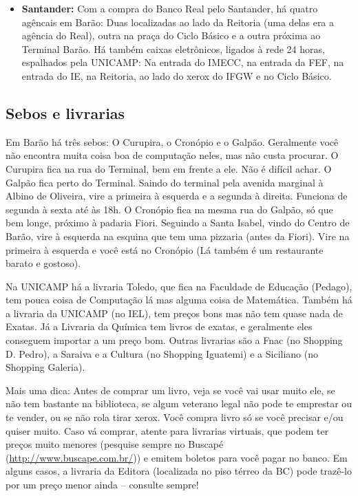 \begin{itemize}
\item  \textbf{Santander:} Com a compra do Banco Real pelo Santander, há quatro agêncais em Barão: Duas localizadas ao lado da Reitoria (uma delas era a agência do Real), outra na praça do Ciclo Básico e a outra próxima ao Terminal Barão. Há também caixas eletrônicos, ligados à rede 24 horas, espalhados pela UNICAMP: Na entrada do IMECC, na entrada da FEF, na entrada do IE, na Reitoria, ao lado do xerox do IFGW e no Ciclo Básico.
\end{itemize}

\subsection{Sebos e livrarias}

Em Barão há três sebos: O Curupira, o Cronópio e o Galpão. Geralmente você não
encontra muita coisa boa de computação neles, mas não custa procurar. O Curupira
fica na rua do Terminal, bem em frente a ele. Não é difícil achar. O Galpão fica
perto do Terminal. Saindo do terminal pela avenida marginal à Albino de
Oliveira, vire a primeira à esquerda e a segunda à direita. Funciona de segunda
à sexta até às 18h. O Cronópio fica na mesma rua do Galpão, só que bem longe,
próximo à padaria Fiori. Seguindo a Santa Isabel, vindo do Centro de Barão, vire
à esquerda na esquina que tem uma pizzaria (antes da Fiori). Vire na primeira
à esquerda e você está no Cronópio (Lá também é um restaurante barato
e gostoso).

Na UNICAMP há a livraria Toledo, que fica na Faculdade de Educação (Pedago), tem
pouca coisa de Computação lá mas alguma coisa de Matemática. Também há
a livraria da UNICAMP (no IEL), tem preços bons mas não tem quase nada de
Exatas. Já a Livraria da Química tem livros de exatas, e geralmente eles
conseguem importar a um preço bom. Outras livrarias são a Fnac (no Shopping D.
Pedro), a Saraiva e a Cultura (no Shopping Iguatemi) e a Siciliano (no Shopping
Galeria).

Mais uma dica: Antes de comprar um livro, veja se você vai usar muito ele, se
não tem bastante na biblioteca, se algum veterano legal não pode te emprestar ou
te vender, ou se não rola tirar xerox. Você compra livro só se você precisar
e/ou quiser muito. Caso vá comprar, atente para livrarias virtuais, que podem
ter preços muito menores (pesquise sempre no Buscapé
(\url{http://www.buscape.com.br/})) e emitem boletos para você pagar no banco.
Em alguns casos, a livraria da Editora (localizada no piso térreo da BC) pode
trazê-lo por um preço menor ainda -- consulte sempre!

